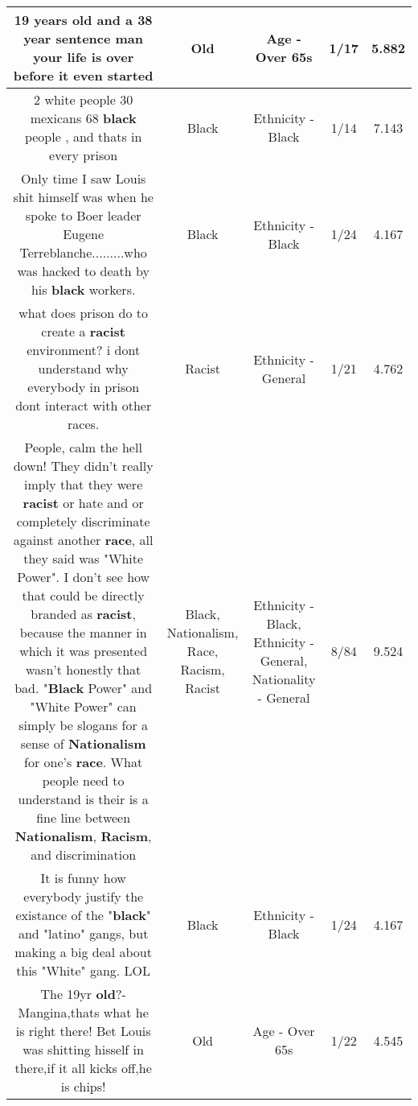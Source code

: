 \documentclass[11pt]{article}
\newlength\mylength
\begin{document}
\begin{center}
\begin{longtable}{|C{.65\mylength}|C{.30\mylength}|C{.12\mylength}|C{.12\mylength}|C{.12\mylength}|}
  \small 19 years \textbf{old} and a 38 year sentence man your life is over before it even started\normalsize   & Old & Age - Over 65s & 1/17 & 5.882 \\  \hline
  \small 2 white people 30 mexicans 68 \textbf{black} people , and thats in every prison\normalsize   & Black & Ethnicity - Black & 1/14 & 7.143 \\  \hline
  \small Only time I saw Louis shit himself was when he spoke to Boer leader Eugene Terreblanche.........who was hacked to death by his \textbf{black} workers.\normalsize   & Black & Ethnicity - Black & 1/24 & 4.167 \\  \hline
  \small what does prison do to create a \textbf{racist} environment? i dont understand why everybody in prison dont interact with other races.\normalsize   & Racist & Ethnicity - General & 1/21 & 4.762 \\  \hline
  \small People, calm the hell down! They didn't really imply that they were \textbf{racist} or hate and or completely discriminate against another \textbf{race}, all they said was "White Power". I don't see how that could be directly branded as \textbf{racist}, because the manner in which it was presented wasn't honestly that bad. "\textbf{Black} Power" and "White Power" can simply be slogans for a sense of \textbf{Nationalism} for one's \textbf{race}. What people need to understand is their is a fine line between \textbf{Nationalism}, \textbf{Racism}, and discrimination\normalsize   & Black, Nationalism, Race, Racism, Racist & Ethnicity - Black, Ethnicity - General, Nationality - General & 8/84 & 9.524 \\  \hline
  \small It is funny how everybody justify the existance of the "\textbf{black}" and "latino" gangs, but making a big deal about this "White" gang. LOL\normalsize   & Black & Ethnicity - Black & 1/24 & 4.167 \\  \hline
  \small The 19yr \textbf{old}?- Mangina,thats what he is right there! Bet Louis was shitting hisself in there,if it all kicks off,he is chips!\normalsize   & Old & Age - Over 65s & 1/22 & 4.545 \\  \hline

\end{longtable}
\end{center}
\end{document}
